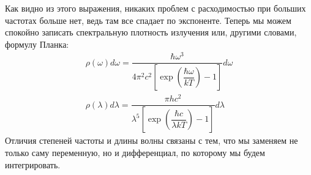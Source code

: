 \documentclass[12pt]{article}
\begin{document}
\vspace{-1mm}
\noindent
Как видно из этого выражения, никаких проблем с расходимостью при больших частотах больше нет, ведь там все спадает по экспоненте. Теперь мы можем спокойно записать спектральную плотность излучения или, другими словами, формулу Планка:
\begin{gather}
\label{eq:sem_01_plank}
    \rho(\omega)d\omega = \dfrac{\hbar \omega^3}{4\pi^2c^2\left[ \exp{\left(\dfrac{\hbar \omega}{kT}\right)} - 1\right]}d\omega\\
    \rho(\lambda) d\lambda = \dfrac{\pi h c^2}{\lambda^5\left[ \exp{\left(\dfrac{\hbar c}{\lambda kT}\right)} - 1\right]}d\lambda
\end{gather}
Отличия степеней частоты и длины волны связаны с тем, что мы заменяем не только саму переменную, но и дифференциал, по которому мы будем интегрировать.
\end{document}
